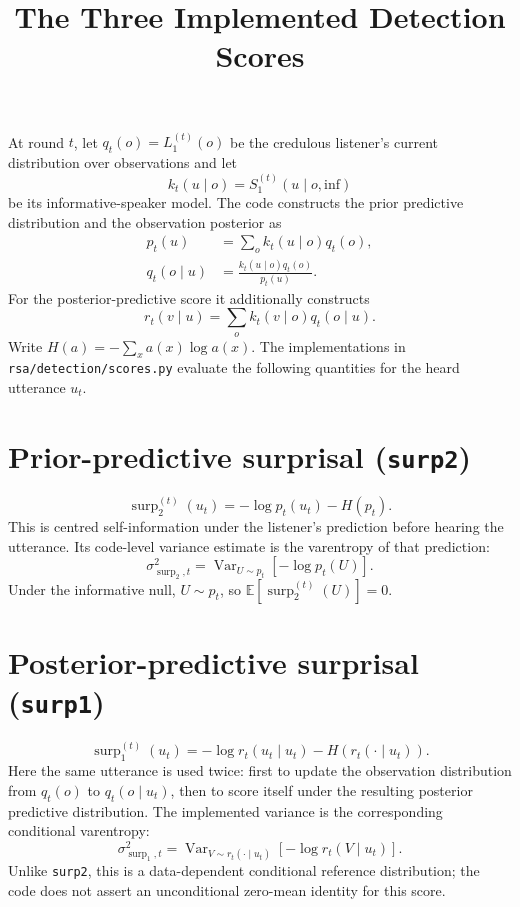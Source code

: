\documentclass[11pt]{article}
\title{The Three Implemented Detection Scores}
\author{}
\date{}
\newcommand{\Lone}{L_1}
\newcommand{\Var}{\operatorname{Var}}
\newcommand{\E}{\mathbb{E}}
\newcommand{\surp}{\operatorname{surp}}
\newcommand{\infgoal}{\mathrm{inf}}
\begin{document}
\maketitle

At round $t$, let $q_t(o) = \Lone^{(t)}(o)$ be the credulous listener's
current distribution over observations and let
\[
    k_t(u\mid o) = S_1^{(t)}(u\mid o,\infgoal)
\]
be its informative-speaker model.  The code constructs the prior
predictive distribution and the observation posterior as
\begin{align*}
    p_t(u) &= \sum_o k_t(u\mid o)q_t(o), \\
    q_t(o\mid u) &= \frac{k_t(u\mid o)q_t(o)}{p_t(u)}.
\end{align*}
For the posterior-predictive score it additionally constructs
\[
    r_t(v\mid u) = \sum_o k_t(v\mid o)q_t(o\mid u).
\]
Write $H(a)=-\sum_x a(x)\log a(x)$.  The implementations in
\texttt{rsa/detection/scores.py} evaluate the following quantities for the
heard utterance $u_t$.

\section*{Prior-predictive surprisal (\texttt{surp2})}

\[
    \surp_2^{(t)}(u_t)
    = -\log p_t(u_t) - H(p_t).
\]
This is centred self-information under the listener's prediction before
hearing the utterance.  Its code-level variance estimate is the
varentropy of that prediction:
\[
    \sigma_{\surp_2,t}^2
    = \Var_{U\sim p_t}\!\left[-\log p_t(U)\right].
\]
Under the informative null, $U\sim p_t$, so
$\E[\surp_2^{(t)}(U)]=0$.

\section*{Posterior-predictive surprisal (\texttt{surp1})}

\[
    \surp_1^{(t)}(u_t)
    = -\log r_t(u_t\mid u_t) - H\!\left(r_t(\cdot\mid u_t)\right).
\]
Here the same utterance is used twice: first to update the observation
distribution from $q_t(o)$ to $q_t(o\mid u_t)$, then to score itself under
the resulting posterior predictive distribution.  The implemented
variance is the corresponding conditional varentropy:
\[
    \sigma_{\surp_1,t}^2
    = \Var_{V\sim r_t(\cdot\mid u_t)}
      \!\left[-\log r_t(V\mid u_t)\right].
\]
Unlike \texttt{surp2}, this is a data-dependent conditional reference
distribution; the code does not assert an unconditional zero-mean identity
for this score.
\end{document}
